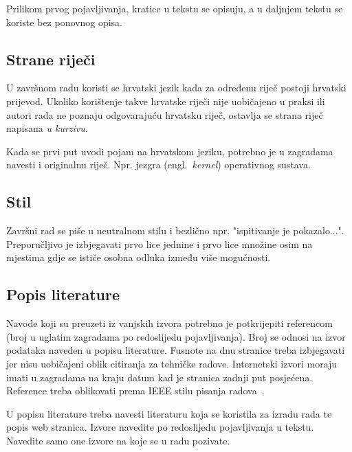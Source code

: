 Prilikom prvog pojavljivanja, kratice u tekstu se opisuju, a u daljnjem tekstu se koriste bez ponovnog opisa. 

\subsection{Strane riječi}
U završnom radu koristi se hrvatski jezik kada za određenu riječ postoji hrvatski prijevod. Ukoliko korištenje takve hrvatske riječi nije 
uobičajeno u praksi ili autori rada ne 
poznaju odgovarajuću hrvatsku riječ, ostavlja se strana riječ napisana \textit{u kurzivu}.

Kada se prvi put uvodi pojam na hrvatskom jeziku, potrebno je u zagradama navesti i originalnu riječ. Npr. jezgra (engl.~\textit{kernel}) operativnog sustava.  

\subsection{Stil}
Završni rad se piše u neutralnom stilu i bezlično npr. "ispitivanje je pokazalo...". 
Preporučljivo je izbjegavati prvo lice jednine i prvo lice množine osim na mjestima gdje se ističe osobna odluka između više mogućnosti. 

\subsection{Popis literature}
Navode koji su preuzeti iz vanjskih izvora potrebno je potkrijepiti referencom (broj u uglatim zagradama po redoslijedu pojavljivanja). Broj se odnosi na izvor podataka naveden u popisu literature. Fusnote na dnu stranice treba izbjegavati jer nisu uobičajeni oblik citiranja za tehničke radove. Internetski izvori moraju imati u zagradama na kraju datum kad je stranica zadnji put posjećena. Reference treba oblikovati prema IEEE stilu pisanja radova~\cite{IEEE}.

U popisu literature treba navesti literaturu koja se koristila za izradu rada te popis web stranica. Izvore navedite po redoslijedu pojavljivanja u tekstu. Navedite samo one izvore na koje se u radu pozivate. 

